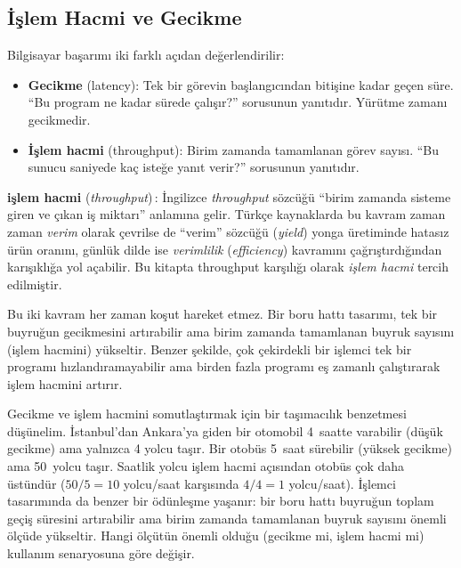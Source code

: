 \subsection{İşlem Hacmi ve Gecikme}
\label{subsec:verim-gecikme}

Bilgisayar başarımı iki farklı açıdan değerlendirilir:

\begin{itemize}
    \item \textbf{Gecikme} (latency): Tek bir görevin başlangıcından bitişine kadar geçen süre. ``Bu program ne kadar sürede çalışır?'' sorusunun yanıtıdır. Yürütme zamanı gecikmedir.
    \item \textbf{İşlem hacmi} (throughput): Birim zamanda tamamlanan görev sayısı. ``Bu sunucu saniyede kaç isteğe yanıt verir?'' sorusunun yanıtıdır.
\end{itemize}

\begin{terimnotu}
\textbf{işlem hacmi} (\emph{throughput})\,: İngilizce \emph{throughput} sözcüğü ``birim zamanda sisteme giren ve çıkan iş miktarı'' anlamına gelir. Türkçe kaynaklarda bu kavram zaman zaman \emph{verim} olarak çevrilse de ``verim'' sözcüğü (\emph{yield}) yonga üretiminde hatasız ürün oranını, günlük dilde ise \emph{verimlilik} (\emph{efficiency}) kavramını çağrıştırdığından karışıklığa yol açabilir. Bu kitapta throughput karşılığı olarak \emph{işlem hacmi} tercih edilmiştir.
\end{terimnotu}

Bu iki kavram her zaman koşut hareket etmez. Bir boru hattı tasarımı, tek bir buyruğun gecikmesini artırabilir ama birim zamanda tamamlanan buyruk sayısını (işlem hacmini) yükseltir. Benzer şekilde, çok çekirdekli bir işlemci tek bir programı hızlandıramayabilir ama birden fazla programı eş zamanlı çalıştırarak işlem hacmini artırır.

Gecikme ve işlem hacmini somutlaştırmak için bir taşımacılık benzetmesi düşünelim. İstanbul'dan Ankara'ya giden bir otomobil 4~saatte varabilir (düşük gecikme) ama yalnızca 4 yolcu taşır. Bir otobüs 5~saat sürebilir (yüksek gecikme) ama 50~yolcu taşır. Saatlik yolcu işlem hacmi açısından otobüs çok daha üstündür ($50/5 = 10$ yolcu/saat karşısında $4/4 = 1$ yolcu/saat). İşlemci tasarımında da benzer bir ödünleşme yaşanır: bir boru hattı buyruğun toplam geçiş süresini artırabilir ama birim zamanda tamamlanan buyruk sayısını önemli ölçüde yükseltir. Hangi ölçütün önemli olduğu (gecikme mi, işlem hacmi mi) kullanım senaryosuna göre değişir.

